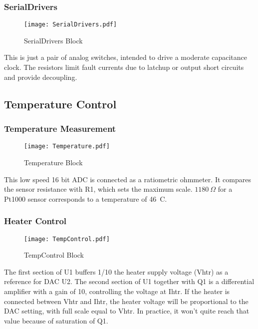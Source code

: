 \documentclass[a4paper,12pt]{article}
\begin{document}
\subsubsection{SerialDrivers}
   \begin{figure}
   \begin{center}
   \texttt{[image: SerialDrivers.pdf]}
   \end{center}
   \caption{SerialDrivers Block}
   \end{figure}
   
This is just a pair of analog switches, intended to drive a moderate capacitance clock. The resistors limit fault currents due to latchup or output short circuits and provide decoupling.

\subsection{Temperature Control}

\subsubsection{Temperature Measurement}
   \begin{figure}
   \begin{center}
   \texttt{[image: Temperature.pdf]}
   \end{center}
   \caption{Temperature Block}
   \end{figure}
   
This low speed 16 bit ADC is connected as a ratiometric ohmmeter. It compares the sensor resistance with R1, which sets the maximum scale. $1180\ \Omega$ for a Pt1000 sensor corresponds to a temperature of 46\ C.

\subsubsection{Heater Control}
   \begin{figure}
   \begin{center}
   \texttt{[image: TempControl.pdf]}
   \end{center}
   \caption{TempControl Block}
   \end{figure}

The first section of U1 buffers 1/10 the heater supply voltage (Vhtr) as a reference for DAC U2. The second section of U1 together with Q1 is a differential amplifier with a gain of 10, controlling the voltage at Ihtr.  If the heater is connected between Vhtr and Ihtr, the heater voltage will be proportional to the DAC setting, with full scale equal to Vhtr. In practice, it won't quite reach that value because of saturation of Q1.
\end{document}

